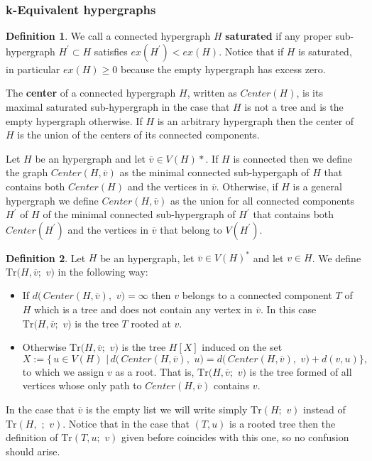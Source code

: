 \documentclass[12pt,notitlepage,a4paper]{article}
\theoremstyle{definition}
\newtheorem{definition}{Definition}[section]
\begin{document}
\subsubsection{k-Equivalent hypergraphs}


\begin{definition}
	We call a connected hypergraph $H$ \textbf{saturated} if any proper 
	sub-hypergraph $H^\prime \subset H$ satisfies $ex(H^\prime)<ex(H)$. 
	Notice that if $H$ is saturated, in particular $ex(H)\geq 0$ because
	the empty hypergraph has excess zero. \par

	The \textbf{center} of a connected hypergraph $H$, written as
	$Center(H)$,  
	is its maximal saturated
	sub-hypergraph in the case that $H$ is not a tree and 
	is the empty hypergraph otherwise.  
	If $H$ is an arbitrary hypergraph
	then the center of $H$ is the union of the
	centers of its connected components. \par
	Let $H$ be an hypergraph and let $\overline{v}\in V(H)*$. If $H$
	is connected then we define the graph $Center(H,\overline{v})$ 
	as the minimal connected sub-hypergaph of $H$ that contains
	both $Center(H)$ and the vertices in $\overline{v}$. Otherwise,
	if $H$ is a general hypergraph we define $Center(H,\overline{v})$ 
	as the union for all connected components $H^\prime$ of $H$
	of the minimal connected sub-hypergraph of $H^\prime$ that
	contains both $Center(H^\prime)$ and the vertices in $\overline{v}$
	that belong to $V(H^\prime)$.
\end{definition}



\begin{definition}
	Let $H$ be an hypergraph, let $\overline{v}\in V(H)^*$
	and let $v\in H$. We define $\mathrm{Tr}\big(
	H,\overline{v};\,\, v\big)$ in the following way:
	\begin{itemize}
		\item If $d\big(\, Center(H, \overline{v})
		, \, \, v \big)=\infty$ then $v$ belongs to a connected
		component $T$ of $H$ which is a tree and does not contain
		any vertex in $\overline{v}$. In this case
		$\mathrm{Tr}\big(
		H,\overline{v};\,\, v\big)$ is the tree $T$ rooted at $v$.
		\item Otherwise $\mathrm{Tr}\big(
		H,\overline{v};\,\, v\big)$ is the tree $H[X]$ 
		induced on the set 
		\[
		X:=\big\{\, u\in V(H) \,\, \big| \, 
		d\big(\, Center(H, \overline{v})
		, \, \, u \big)= d\big(\, Center(H, \overline{v})
		, \, \, v \big) + d(v,u)
		\big\},
		\]
		to which we assign $v$ as a root. That is,
		$\mathrm{Tr}\big(
		H,\overline{v};\,\, v\big)$ is the tree formed of all 
		vertices whose only path to $Center(H,\overline{v})$ 
		contains $v$. 		
	\end{itemize}
	In the case that $\overline{v}$ is the empty list we will write
	simply $\mathrm{Tr}(H;\,\, v)$ instead of 
	$\mathrm{Tr}(H,\, \, ;\,\, v)$. Notice that in the case that
	$(T,u)$ is a rooted tree then the definition of 
	$\mathrm{Tr}(T,u;\, \, v)$ given before coincides with this one,
	so no confusion should arise. 	
\end{definition}
\end{document}
